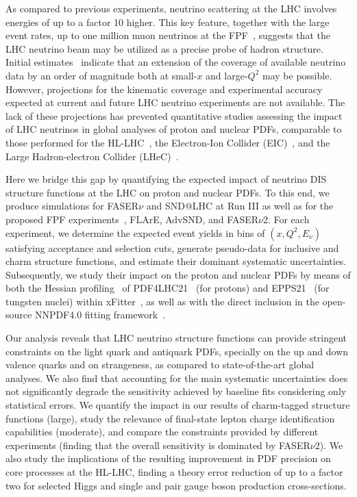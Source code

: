 As compared to  previous experiments,  neutrino
scattering at the LHC involves energies of up to a factor 10  higher.
%
This key feature, together with the large event rates,
up to one million muon neutrinos at the FPF~\cite{Kling:2021gos},
suggests that the LHC  neutrino beam may be utilized
as a precise probe of hadron structure.
%
Initial estimates~\cite{Feng:2022inv} indicate that an extension of the coverage of
available neutrino data by an order of magnitude both at small-$x$
and large-$Q^2$ may be possible.
%
However, projections for the kinematic coverage
and experimental accuracy expected at current
and future LHC neutrino experiments are not available.
%
The lack of these projections has prevented quantitative studies assessing the impact
of LHC neutrinos in global analyses of proton and nuclear PDFs, comparable to
those performed for the HL-LHC~\cite{AbdulKhalek:2018rok,Azzi:2019yne}, the Electron-Ion Collider (EIC)~\cite{AbdulKhalek:2021gbh,Khalek:2021ulf,AbdulKhalek:2019mzd}, and the
Large Hadron-electron Collider (LHeC)~\cite{AbdulKhalek:2019mps,LHeC:2020van,LHeCStudyGroup:2012zhm}. 

Here we bridge this gap by quantifying
the expected impact of  neutrino DIS structure functions at the LHC on proton and nuclear PDFs.
%
To this end, we produce simulations for  FASER$\nu$ and SND@LHC at Run III 
as well as for the proposed FPF experiments~\cite{Anchordoqui:2021ghd,Feng:2022inv,Batell:2021blf,Batell:2021aja}, FLArE, AdvSND, and FASER$\nu$2.
%
For each experiment, we determine the expected event yields in bins of $(x,Q^2,E_\nu)$
satisfying acceptance and selection cuts,
generate pseudo-data for  inclusive and charm 
structure functions, 
and estimate their dominant systematic uncertainties.
%
Subsequently, we study their impact on the proton and nuclear PDFs by means of both the Hessian profiling~\cite{Paukkunen:2014zia,  Schmidt:2018hvu, AbdulKhalek:2018rok, HERAFitterdevelopersTeam:2015cre}
of  PDF4LHC21~\cite{PDF4LHCWorkingGroup:2022cjn} (for protons) and EPPS21~\cite{Eskola:2021nhw}
(for tungsten nuclei)
within {\sc\small xFitter}~\cite{Alekhin:2014irh, Bertone:2017tig, xFitter:2022zjb, xFitter:web},
as well as with the direct inclusion in the open-source NNPDF4.0 fitting framework~\cite{NNPDF:2021uiq}.

Our analysis reveals that  LHC neutrino structure functions can provide  stringent constraints
on the light quark and antiquark PDFs, specially on the up and down
valence quarks and on strangeness, as compared to state-of-the-art global analyses.
%
We also  find that accounting for the main systematic uncertainties does not significantly
degrade the sensitivity achieved by baseline fits considering only statistical errors.
%
We quantify the impact in our results of charm-tagged structure functions (large), study the relevance
of final-state lepton charge identification capabilities (moderate), and compare the constraints
provided by different experiments (finding that the overall sensitivity is dominated by FASER$\nu$2).
%
We also study the implications of the resulting improvement in PDF precision
on core processes at the HL-LHC, finding a theory error reduction
of up to a factor two for selected  Higgs and  single and pair gauge boson production
cross-sections. 


